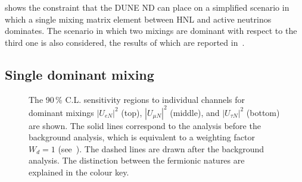  shows the constraint that the DUNE ND can place on a simplified scenario %
in which a single mixing matrix element between HNL and active neutrinos dominates.
The scenario in which two mixings are dominant with respect to the third one is also considered, %
the results of which are reported in~.

\subsection{Single dominant mixing}
\label{sec:dominant}

\begin{figure}
	\centering
	{\resizebox{\linewidth}{!}{}}
	\vspace{0.05em}

	{\resizebox{\linewidth}{!}{}}
	\vspace{0.05em}

	{\resizebox{\linewidth}{!}{}}

	\caption[Sensitivity regions to individual channels for dominant mixings with background analysis]%
		{The 90\,\% C.L. sensitivity regions to individual channels for dominant mixings %
		$|U_{e N}|^2$ (top), $|U_{\mu N}|^2$ (middle), and $|U_{\tau N}|^2$ (bottom) are shown.
		The solid lines correspond to the analysis before the background analysis, which is equivalent %
		to a weighting factor $W_d = 1$ (see~).
		The dashed lines are drawn after the background analysis.
		The distinction between the fermionic natures are explained in the colour key.}
	\label{fig:senseW}
\end{figure}



